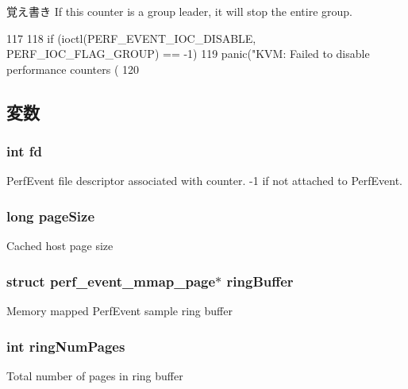 \begin{DoxyNote}{覚え書き}
If this counter is a group leader, it will stop the entire group. 
\end{DoxyNote}



\begin{DoxyCode}
117 {
118     if (ioctl(PERF_EVENT_IOC_DISABLE, PERF_IOC_FLAG_GROUP) == -1)
119         panic("KVM: Failed to disable performance counters (%
120 }
\end{DoxyCode}


\subsection{変数}
\hypertarget{classPerfKvmCounter_a6f8059414f0228f0256115e024eeed4b}{
\subsubsection[{fd}]{\setlength{\rightskip}{0pt plus 5cm}int {\bf fd}}}
\label{classPerfKvmCounter_a6f8059414f0228f0256115e024eeed4b}
PerfEvent file descriptor associated with counter. -\/1 if not attached to PerfEvent. \hypertarget{classPerfKvmCounter_a055d35409d0ddd7689a36c45a8d9b89b}{
\subsubsection[{pageSize}]{\setlength{\rightskip}{0pt plus 5cm}long {\bf pageSize}}}
\label{classPerfKvmCounter_a055d35409d0ddd7689a36c45a8d9b89b}
Cached host page size \hypertarget{classPerfKvmCounter_ab87c9aa7bfe943c16292c643bf6ceb58}{
\subsubsection[{ringBuffer}]{\setlength{\rightskip}{0pt plus 5cm}struct perf\_\-event\_\-mmap\_\-page$\ast$ {\bf ringBuffer}}}
\label{classPerfKvmCounter_ab87c9aa7bfe943c16292c643bf6ceb58}
Memory mapped PerfEvent sample ring buffer \hypertarget{classPerfKvmCounter_ab445fb16e36d61f54c9c6ca0a9d8c8db}{
\subsubsection[{ringNumPages}]{\setlength{\rightskip}{0pt plus 5cm}int {\bf ringNumPages}}}
\label{classPerfKvmCounter_ab445fb16e36d61f54c9c6ca0a9d8c8db}
Total number of pages in ring buffer 

